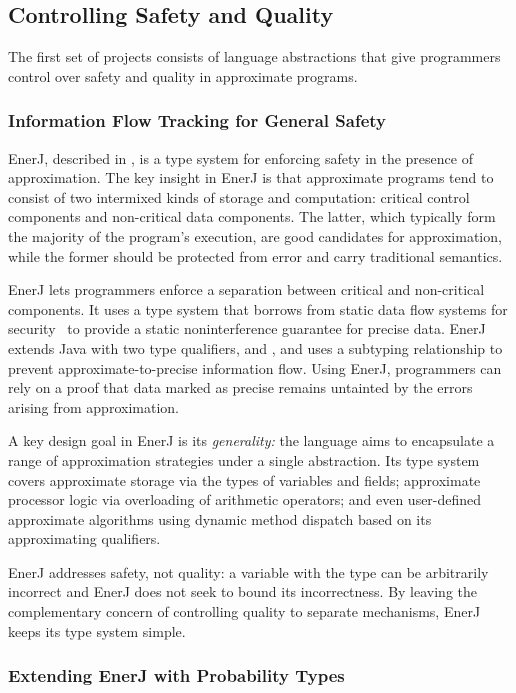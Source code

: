 \subsection{Controlling Safety and Quality}

The first set of projects consists of language abstractions that give
programmers control over safety and quality in approximate programs.

\subsubsection{Information Flow Tracking for General Safety}

EnerJ, described in , is a type system for enforcing safety in
the presence of approximation.
The key insight in EnerJ is that approximate programs tend to consist of two
intermixed kinds of storage and computation:
critical control components
and non-critical data components.
The latter, which typically form the majority of the program's execution,
are good candidates for approximation,
while the former should be protected from error and carry traditional
semantics.

EnerJ lets programmers enforce a separation between critical and non-critical
components.
It uses a type system that
borrows from static data
flow systems for security~\cite{jif} to provide a static
noninterference guarantee for precise data.
EnerJ extends Java with two type qualifiers,  and
, and uses a subtyping relationship to prevent
approximate-to-precise information flow.
Using EnerJ, programmers can rely
on a proof that data marked as precise remains untainted by the errors arising
from approximation.

A key design goal in EnerJ is its \emph{generality:}
the language aims to encapsulate a range of approximation strategies under a
single abstraction.
Its type system covers approximate storage via the types of variables and
fields;
approximate processor logic via overloading of arithmetic operators;
and even user-defined approximate algorithms using dynamic method dispatch
based on its approximating qualifiers.

EnerJ addresses safety, not quality:
a variable with the type  can be arbitrarily incorrect and
EnerJ does not seek to bound its incorrectness.
By leaving the complementary concern of controlling quality to separate
mechanisms, EnerJ keeps its type system simple.

\subsubsection{Extending EnerJ with Probability Types}

